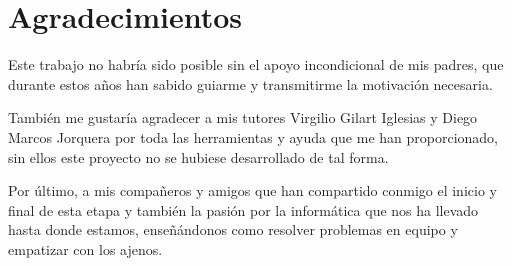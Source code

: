 


\chapter*{Agradecimientos}


\thispagestyle{empty}
\vspace{1cm}

Este trabajo no habría sido posible sin el apoyo incondicional de mis padres, que durante estos años han sabido guiarme y transmitirme la motivación necesaria.

También me gustaría agradecer a mis tutores  Virgilio Gilart Iglesias y  Diego Marcos Jorquera por toda las herramientas y ayuda que me han proporcionado, sin ellos este proyecto no se hubiese desarrollado de tal forma.

Por último, a mis compañeros y amigos que han compartido conmigo el inicio y final de esta etapa y también la pasión por la informática que nos ha llevado hasta donde estamos, enseñándonos como resolver problemas en equipo y empatizar con los ajenos.

